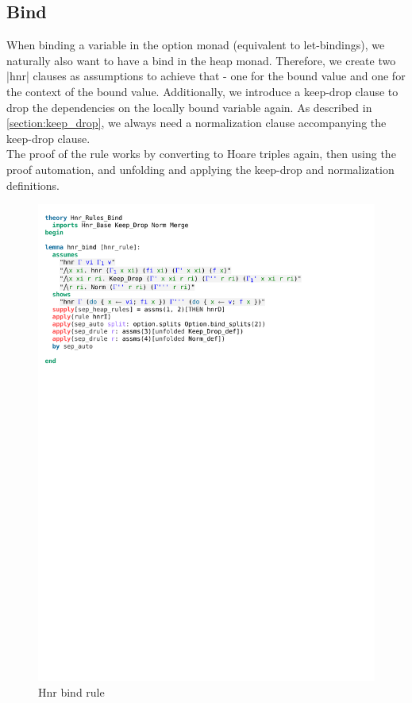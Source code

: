 \subsection{Bind}

When binding a variable in the option monad (equivalent to let-bindings), we naturally also want to have a bind in the heap monad. Therefore, we create two |hnr| clauses as assumptions to achieve that - one for the bound value and one for the context of the bound value. Additionally, we introduce a keep-drop clause to drop the dependencies on the locally bound variable again. As described in \autoref{section:keep_drop}, we always need a normalization clause accompanying the keep-drop clause.\\
The proof of the rule works by converting to Hoare triples again, then using the proof automation, and unfolding and applying the keep-drop and normalization definitions.

\begin{figure}[htpb]
    \includegraphics[trim={0 23,4cm 0 2,4cm}, clip, width=1.00\textwidth]{figures/Theory_Hnr_Rules_Bind.pdf}
    \caption[Hnr bind rule]{Hnr bind rule}
    \label{fig:hnr_bind}
\end{figure}

